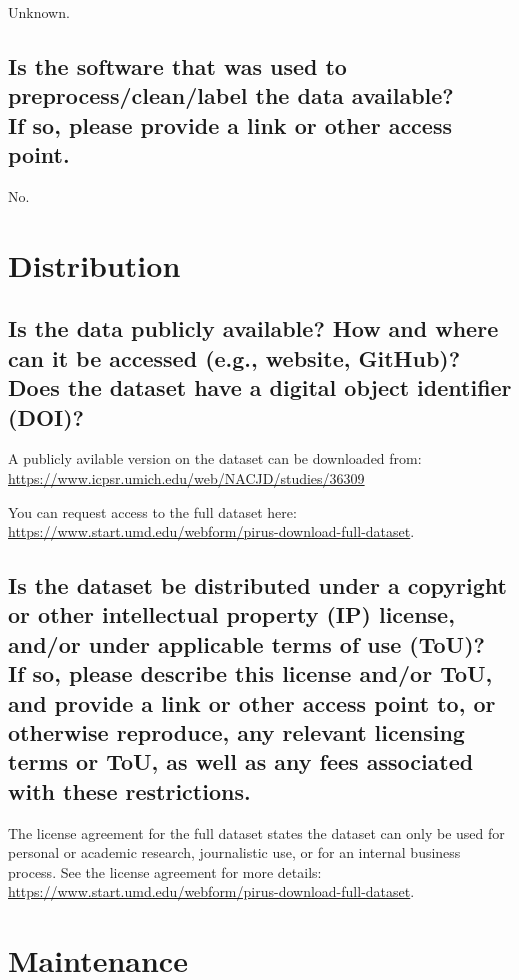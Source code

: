 \documentclass[letterpaper, 10 pt, conference]{ieeeconf}  %
\newcommand{\subtitle}[1]{{\\ \small \normalfont \color{purple} #1}}
\begin{document}
Unknown.

\subsection{Is the software that was used to preprocess/clean/label the data available? \subtitle{If so, please provide a link or other access point.}}

No.

\section{Distribution}

\subsection{Is the data publicly available? How and where can it be accessed (e.g., website, GitHub)? \subtitle{Does the dataset have a digital object identifier (DOI)?}}

A publicly avilable version on the dataset can be downloaded from: \\
\href{https://www.icpsr.umich.edu/web/NACJD/studies/36309}{https://www.icpsr.umich.edu/web/NACJD/studies/36309}

You can request access to the full dataset here: \href{https://www.start.umd.edu/webform/pirus-download-full-dataset}{https://www.start.umd.edu/webform/pirus-download-full-dataset}.

\subsection{Is the dataset be distributed under a copyright or other intellectual property (IP) license, and/or under applicable terms of use (ToU)? \subtitle{If so, please describe this license and/or ToU, and provide a link or other access point to, or otherwise reproduce, any relevant licensing terms or ToU, as well as any fees associated with these restrictions.}}

The license agreement for the full dataset states the dataset can only be used for personal or academic research, journalistic use, or for an internal business process. See the license agreement for more details: \\ \href{https://www.start.umd.edu/webform/pirus-download-full-dataset}{https://www.start.umd.edu/webform/pirus-download-full-dataset}.

\section{Maintenance}
\end{document}
